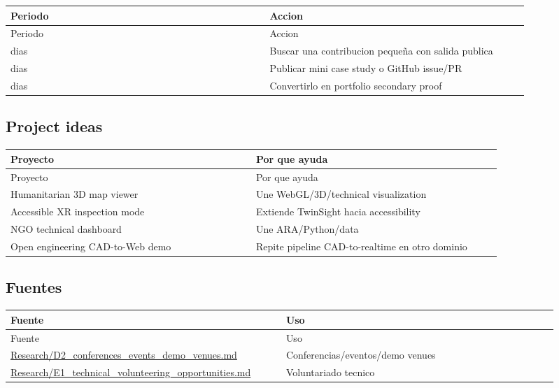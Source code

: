 \begin{center}
\scriptsize
\begin{longtable}{>{\raggedright\arraybackslash}p{0.455\linewidth} >{\raggedright\arraybackslash}p{0.455\linewidth}}
\toprule
Periodo & Accion \\
\midrule
\endfirsthead
\toprule
Periodo & Accion \\
\midrule
\endhead
30 dias & Buscar una contribucion pequeña con salida publica \\
60 dias & Publicar mini case study o GitHub issue/PR \\
90 dias & Convertirlo en portfolio secondary proof \\
\bottomrule
\end{longtable}
\end{center}


\subsection{Project ideas}


\begin{center}
\scriptsize
\begin{longtable}{>{\raggedright\arraybackslash}p{0.455\linewidth} >{\raggedright\arraybackslash}p{0.455\linewidth}}
\toprule
Proyecto & Por que ayuda \\
\midrule
\endfirsthead
\toprule
Proyecto & Por que ayuda \\
\midrule
\endhead
Humanitarian 3D map viewer & Une WebGL/3D/technical visualization \\
Accessible XR inspection mode & Extiende TwinSight hacia accessibility \\
NGO technical dashboard & Une ARA/Python/data \\
Open engineering CAD-to-Web demo & Repite pipeline CAD-to-realtime en otro dominio \\
\bottomrule
\end{longtable}
\end{center}


\subsection{Fuentes}


\begin{center}
\scriptsize
\begin{longtable}{>{\raggedright\arraybackslash}p{0.455\linewidth} >{\raggedright\arraybackslash}p{0.455\linewidth}}
\toprule
Fuente & Uso \\
\midrule
\endfirsthead
\toprule
Fuente & Uso \\
\midrule
\endhead
\href{file:///E:/Laboral/Research/D2_conferences_events_demo_venues.md}{Research/D2\_conferences\_events\_demo\_venues.md} & Conferencias/eventos/demo venues \\
\href{file:///E:/Laboral/Research/E1_technical_volunteering_opportunities.md}{Research/E1\_technical\_volunteering\_opportunities.md} & Voluntariado tecnico \\
\bottomrule
\end{longtable}
\end{center}
